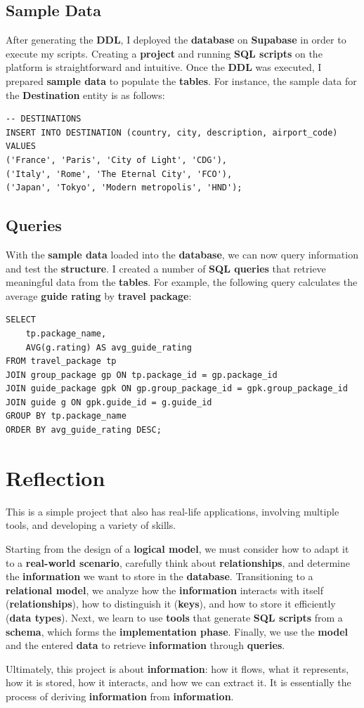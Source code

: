 \documentclass{article}
\begin{document}
\subsection{Sample Data}

After generating the \textbf{DDL}, I deployed the \textbf{database} on \textbf{Supabase} in order to execute my scripts. Creating a \textbf{project} and running \textbf{SQL scripts} on the platform is straightforward and intuitive. Once the \textbf{DDL} was executed, I prepared \textbf{sample data} to populate the \textbf{tables}. For instance, the sample data for the \textbf{Destination} entity is as follows:

\begin{lstlisting}
-- DESTINATIONS
INSERT INTO DESTINATION (country, city, description, airport_code)
VALUES
('France', 'Paris', 'City of Light', 'CDG'),
('Italy', 'Rome', 'The Eternal City', 'FCO'),
('Japan', 'Tokyo', 'Modern metropolis', 'HND');    
\end{lstlisting}

\subsection{Queries}
With the \textbf{sample data} loaded into the \textbf{database}, we can now query information and test the \textbf{structure}. I created a number of \textbf{SQL queries} that retrieve meaningful data from the \textbf{tables}. For example, the following query calculates the average \textbf{guide rating} by \textbf{travel package}:

\begin{lstlisting}
SELECT 
    tp.package_name,
    AVG(g.rating) AS avg_guide_rating
FROM travel_package tp
JOIN group_package gp ON tp.package_id = gp.package_id
JOIN guide_package gpk ON gp.group_package_id = gpk.group_package_id
JOIN guide g ON gpk.guide_id = g.guide_id
GROUP BY tp.package_name
ORDER BY avg_guide_rating DESC;    
\end{lstlisting}

\section{Reflection}
This is a simple project that also has real-life applications, involving multiple tools, and developing a variety of skills. 

Starting from the design of a \textbf{logical model}, we must consider how to adapt it to a \textbf{real-world scenario}, carefully think about \textbf{relationships}, and determine the \textbf{information} we want to store in the \textbf{database}. Transitioning to a \textbf{relational model}, we analyze how the \textbf{information} interacts with itself (\textbf{relationships}), how to distinguish it (\textbf{keys}), and how to store it efficiently (\textbf{data types}). Next, we learn to use \textbf{tools} that generate \textbf{SQL scripts} from a \textbf{schema}, which forms the \textbf{implementation phase}. Finally, we use the \textbf{model} and the entered \textbf{data} to retrieve \textbf{information} through \textbf{queries}. 

Ultimately, this project is about \textbf{information}: how it flows, what it represents, how it is stored, how it interacts, and how we can extract it. It is essentially the process of deriving \textbf{information} from \textbf{information}.
\end{document}

